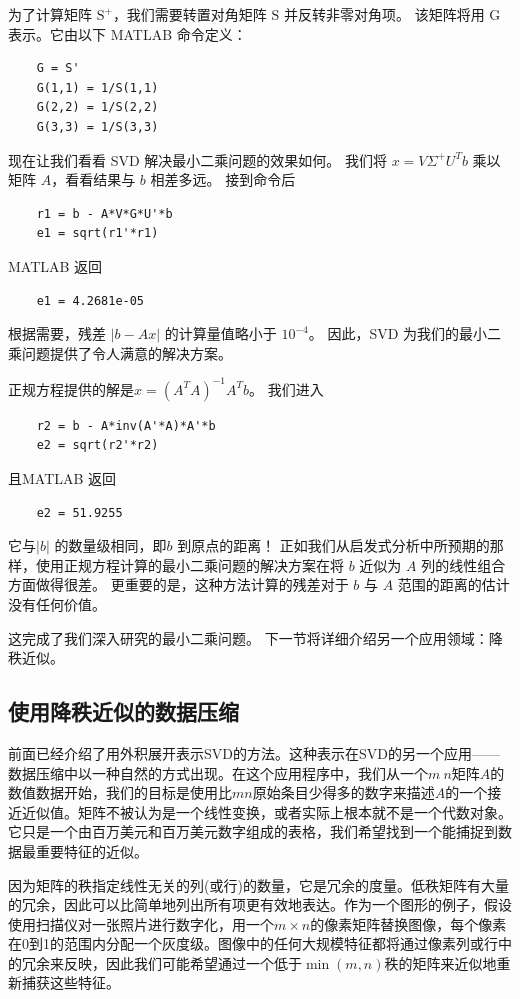 \documentclass[11pt,a4paper,twoside]{article}
\begin{document}
\begin{CJK}{UTF8}{gbsn}
为了计算矩阵 $\mathrm{S}^{+}$，我们需要转置对角矩阵 $\mathrm{S}$ 并反转非零对角项。 该矩阵将用 G 表示。它由以下 MATLAB 命令定义：
\begin{lstlisting}
	G = S'
	G(1,1) = 1/S(1,1)
	G(2,2) = 1/S(2,2)
	G(3,3) = 1/S(3,3)
\end{lstlisting}
现在让我们看看 SVD 解决最小二乘问题的效果如何。 我们将 $x=V \Sigma^{+} U^{T} b$ 乘以矩阵 $A$，看看结果与 $b$ 相差多远。 接到命令后
\begin{lstlisting}
	r1 = b - A*V*G*U'*b
	e1 = sqrt(r1'*r1)
\end{lstlisting}
MATLAB 返回
\begin{lstlisting}
	e1 = 4.2681e-05
\end{lstlisting}

根据需要，残差 $|b-A x|$ 的计算量值略小于 $10^{-4}$。 因此，SVD 为我们的最小二乘问题提供了令人满意的解决方案。

正规方程提供的解是$x=\left(A^{T} A\right)^{-1} A^{T} b$。 我们进入
\begin{lstlisting}
	r2 = b - A*inv(A'*A)*A'*b
	e2 = sqrt(r2'*r2)
\end{lstlisting}
且MATLAB 返回
\begin{lstlisting}
	e2 = 51.9255
\end{lstlisting}
它与$|b|$ 的数量级相同，即$b$ 到原点的距离！ 正如我们从启发式分析中所预期的那样，使用正规方程计算的最小二乘问题的解决方案在将 $b$ 近似为 $A$ 列的线性组合方面做得很差。 更重要的是，这种方法计算的残差对于 $b$ 与 $A$ 范围的距离的估计没有任何价值。

这完成了我们深入研究的最小二乘问题。 下一节将详细介绍另一个应用领域：降秩近似。

\subsection{使用降秩近似的数据压缩}
前面已经介绍了用外积展开表示SVD的方法。这种表示在SVD的另一个应用——数据压缩中以一种自然的方式出现。在这个应用程序中，我们从一个$m \ n$矩阵$A$的数值数据开始，我们的目标是使用比$m n$原始条目少得多的数字来描述$A$的一个接近近似值。矩阵不被认为是一个线性变换，或者实际上根本就不是一个代数对象。它只是一个由百万美元和百万美元数字组成的表格，我们希望找到一个能捕捉到数据最重要特征的近似。

因为矩阵的秩指定线性无关的列(或行)的数量，它是冗余的度量。低秩矩阵有大量的冗余，因此可以比简单地列出所有项更有效地表达。作为一个图形的例子，假设使用扫描仪对一张照片进行数字化，用一个$m \times n$的像素矩阵替换图像，每个像素在0到1的范围内分配一个灰度级。图像中的任何大规模特征都将通过像素列或行中的冗余来反映，因此我们可能希望通过一个低于$\min (m, n)$秩的矩阵来近似地重新捕获这些特征。


\end{CJK}
\end{document}
